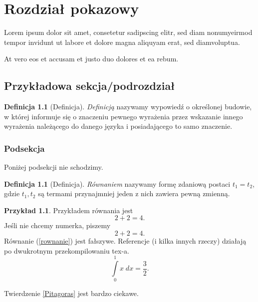 \documentclass[a4paper,11pt,twoside]{report}
\theoremstyle{definition}
\newtheorem{example}[theorem]{Przykład}
\newtheorem{definition}[theorem]{Definicja}
\begin{document}
\chapter{Rozdział pokazowy}


Lorem ipsum dolor sit amet, consetetur sadipscing elitr, sed diam nonumyeirmod tempor invidunt ut labore et dolore magna aliquyam erat, sed diamvoluptua.

At vero eos et accusam et justo duo dolores et ea rebum.


\section{Przykładowa sekcja/podrozdział}

\begin{definition}[Definicja]
\textit{Definicją} nazywamy wypowiedź o określonej budowie, w której informuje się o znaczeniu pewnego wyrażenia przez wskazanie innego wyrażenia należącego do danego języka i posiadającego to samo znaczenie.
\end{definition}

\subsection{Podsekcja}

Poniżej podsekcji nie schodzimy.

\begin{definition}[Definicja]
\textit{Równaniem} nazywamy formę zdaniową postaci $t_1 = t_2$, gdzie $t_1, t_2$ są termami przynajmniej jeden z nich zawiera pewną zmienną.
\end{definition}

\begin{example}
Przykładem równania jest
\begin{equation}
2+2=4.
\end{equation}
Jeśli nie chcemy numerka, piszemy
\begin{equation*}
2+2=4.
\end{equation*}
Równanie (\ref{rownanie}) jest fałszywe. Referencje (i kilka innych rzeczy) działają po dwukrotnym przekompilowaniu tex-a.
\begin{equation}\label{rownanie}
\int \limits_{0}^{1} x \; dx = \frac{3}{2}.
\end{equation}

\end{example}

Twierdzenie \ref{Pitagoras} jest bardzo ciekawe.
\end{document}
